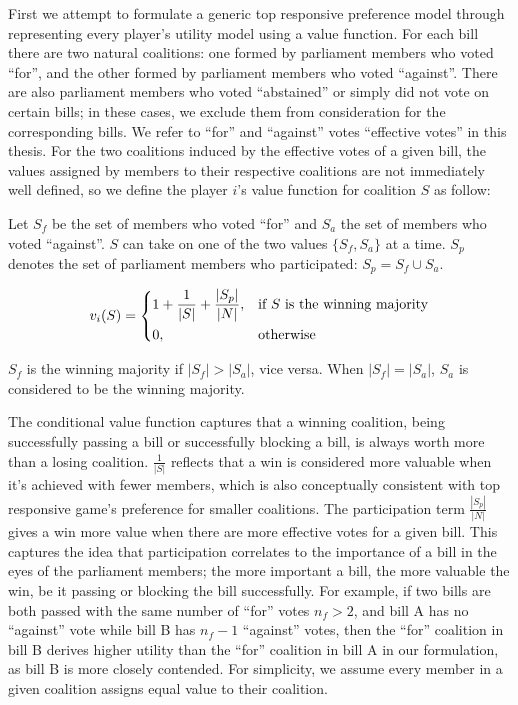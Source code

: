 First we attempt to formulate a generic top responsive preference model
through representing every player's utility model using a value function.
For each bill there are two natural coalitions:
one formed by parliament members who voted ``for'',
and the other formed by parliament members who voted ``against''.
There are also parliament members who voted ``abstained'' or simply did
not vote on certain bills; in these cases, we exclude them from
consideration for the corresponding bills.
We refer to ``for'' and ``against'' votes ``effective votes'' in this thesis.
For the two coalitions induced by the effective votes of a given bill, the
values assigned by members to their respective coalitions are not immediately
well defined, so we define the player $i$'s value function for coalition $S$
as follow:

Let $S_f$ be the set of members who voted ``for'' and
$S_a$ the set of members who voted ``against''.
$S$ can take on one of the two values $\{S_f, S_a\}$ at a time.
$S_p$ denotes the set of parliament members who participated: $S_p = S_f \cup S_a$.

\begin{equation}
\label{eq:value_function}
  v_i(S) =
  \begin{dcases}
      1 + \frac{1}{|S|} + \frac{|S_p|}{|N|},& \text{if $S$ is the winning majority}\\
      0,              & \text{otherwise}
  \end{dcases}
\end{equation}

$S_f$ is the winning majority if $|S_f| > |S_a|$, vice versa. When $|S_f| = |S_a|$, $S_a$ is considered to be the winning majority.

The conditional value function captures that a winning coalition,
being successfully passing a bill or successfully blocking a bill,
is always worth more than a losing coalition.
$\frac{1}{|S|}$ reflects that a win is considered more valuable when it's
achieved with fewer members, which is also conceptually consistent with
top responsive game's preference for smaller coalitions.
The participation term $\frac{|S_p|}{|N|}$ gives a win more value when there
are more effective votes for a given bill.
This captures the idea that participation correlates to the importance of a
bill in the eyes of the parliament members; the more important a bill, the more
valuable the win, be it passing or blocking the bill successfully.
For example, if two bills are both passed with the same number of ``for''
votes $n_f > 2$, and bill A has no ``against'' vote while bill B has $n_f - 1$
``against'' votes, then the ``for'' coalition in bill B derives higher utility
than the ``for'' coalition in bill A in our formulation, as bill B is more
closely contended.
For simplicity, we assume every member in a given coalition assigns
equal value to their coalition.

